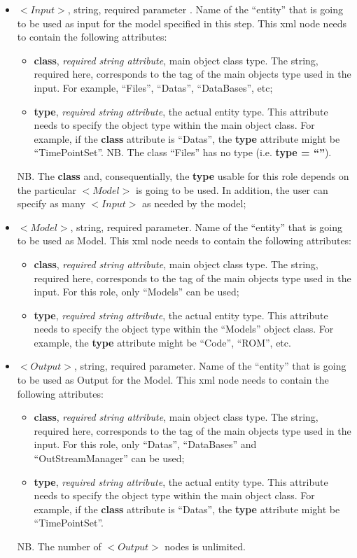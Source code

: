 \begin{itemize}
\item $<Input>$, string, required parameter . Name of the ``entity'' that is going to be used as input for the model specified in this step. This xml node needs to contain the following attributes:
\begin{itemize}
  \item \textbf{class}, \textit{required string attribute}, main object class type. The string, required here, corresponds to the tag of the main objects type used in the input. For example, ``Files'', ``Datas'', ``DataBases'', etc;
  \item \textbf{type}, \textit{required string attribute}, the actual entity type. This attribute needs to specify the object type within the main object class. For example, if the  \textbf{class} attribute is ``Datas'', the \textbf{type} attribute might be ``TimePointSet''. NB. The class ``Files'' has no type (i.e. \textbf{type = ``''}).
\end{itemize}
NB. The \textbf{class} and, consequentially,  the \textbf{type} usable for this role depends on the particular $<Model>$ is going to be used. In addition, the user can specify as many $<Input>$ as needed by the model;
\item $<Model>$, string, required parameter. Name of the ``entity'' that is going to be used as Model. This xml node needs to contain the following attributes:
\begin{itemize}
  \item \textbf{class}, \textit{required string attribute}, main object class type. The string, required here, corresponds to the tag of the main objects type used in the input. For this role, only ``Models'' can be used;
  \item \textbf{type}, \textit{required string attribute}, the actual entity type. This attribute needs to specify the object type within the ``Models'' object class. For example, the \textbf{type} attribute might be ``Code'', ``ROM'', etc.
\end{itemize}
\item $<Output>$, string, required parameter. Name of the ``entity'' that is going to be used as Output for the Model. This xml node needs to contain the following attributes:
\begin{itemize}
  \item \textbf{class}, \textit{required string attribute}, main object class type. The string, required here, corresponds to the tag of the main objects type used in the input. For this role, only ``Datas'', ``DataBases'' and ``OutStreamManager'' can be used;
  \item \textbf{type}, \textit{required string attribute}, the actual entity type. This attribute needs to specify the object type within the main object class. For example, if the  \textbf{class} attribute is ``Datas'', the \textbf{type} attribute might be ``TimePointSet''.
\end{itemize}
NB. The number of $<Output>$ nodes is unlimited.
\end{itemize}

